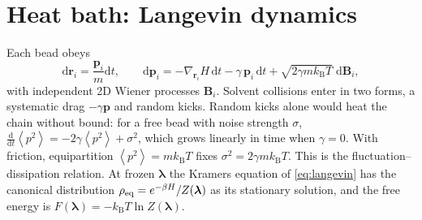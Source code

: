 \documentclass[11pt,a4paper]{article}
\newcommand{\kT}{k_{\mathrm B}T}
\newcommand{\dd}{\mathrm{d}}
\newcommand{\avg}[1]{\left\langle #1\right\rangle}
\newcommand{\lam}{\bm{\lambda}}
\begin{document}
\section{Heat bath: Langevin dynamics}
\label{sec:bath}

Each bead obeys
\begin{equation}
\dd\bm r_i=\frac{\bm p_i}{m}\dd t,\qquad
\dd\bm p_i = -\nabla_{\bm r_i}H\,\dd t - \gamma\,\bm p_i\,\dd t + \sqrt{2\gamma m\kT}\;\dd\bm B_i ,
\label{eq:langevin}
\end{equation}
with independent 2D Wiener processes $\bm B_i$. Solvent collisions enter in two forms, a
systematic drag $-\gamma\bm p$ and random kicks. Random kicks alone would heat the chain
without bound: for a free bead with noise strength $\sigma$, $\tfrac{\dd}{\dd t}\avg{p^2}=-2\gamma\avg{p^2}+\sigma^2$,
which grows linearly in time when $\gamma=0$. With friction, equipartition $\avg{p^2}=m\kT$
fixes $\sigma^2=2\gamma m\kT$. This is the fluctuation--dissipation relation. At frozen $\lam$ the
Kramers equation of \eqref{eq:langevin} has the canonical distribution
$\rho_{\rm eq}=e^{-\beta H}/Z(\lam)$ as its stationary solution, and the free energy is
$F(\lam)=-\kT\ln Z(\lam)$.
\end{document}
